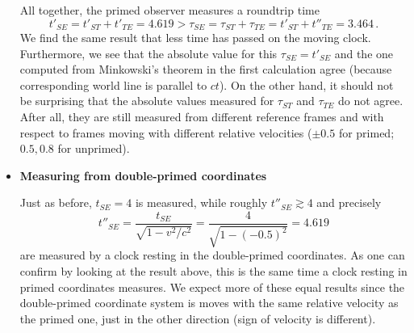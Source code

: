 \documentclass[../relativity_main.tex]{subfiles}
\begin{document}
\begin{ex}
\begin{itemize}
		All together, the primed observer measures a roundtrip time
		\begin{equation*}
			t'_{SE} = t'_{ST} + t'_{TE} = 4.619 > \tau_{SE} = \tau_{ST} + \tau_{TE} = t'_{ST} + t''_{TE} = 3.464 \, .
		\end{equation*}
		We find the same result that less time has passed on the moving clock. Furthermore, we see that the absolute value for this $\tau_{SE} = t'_{SE}$ and the one computed from Minkowski's theorem in the first calculation agree (because corresponding world line is parallel to $ct$). On the other hand, it should not be surprising that the absolute values measured for $\tau_{ST}$ and $\tau_{TE}$ do not agree. After all, they are still measured from different reference frames and with respect to frames moving with different relative velocities ($\pm 0.5$ for primed; $0.5, 0.8$ for unprimed).\\
	
		
		
		
		\item \textbf{Measuring from double-primed coordinates}
	
		Just as before, $t_{SE} = 4$ is measured, while roughly $t''_{SE} \gtrsim 4$ and precisely
		\begin{equation*}
			t''_{SE} = \frac{t_{SE}}{\sqrt{1 - v^2 / c^2}} = \frac{4}{\sqrt{1 - (-0.5)^2}} = 4.619
		\end{equation*}
		are measured by a clock resting in the double-primed coordinates. As one can confirm by looking at the result above, this is the same time a clock resting in primed coordinates measures. We expect more of these equal results since the double-primed coordinate system is moves with the same relative velocity as the primed one, just in the other direction (sign of velocity is different).
	

\end{itemize}
\end{ex}
\end{document}

